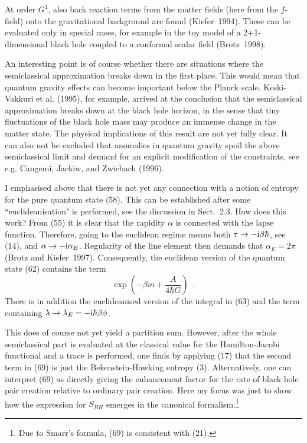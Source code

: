 \documentclass[12pt]{article}
\def\I{{\rm i}}
\newcommand{\be}{\begin{equation}}
\newcommand{\ee}{\end{equation}}
\begin{document}
At order $G^1$, also back reaction terms from the matter fields
(here from the $f$-field) onto the gravitational background
are found (Kiefer~1994). These can be evaluated only in special cases,
for example in the toy model of a 2+1-dimensional black hole
coupled to a conformal scalar field (Brotz~1998).

An interesting point is of course whether there are situations
where the semiclassical approximation breaks down in the first
place. This would mean that quantum gravity effects can become
important below the Planck scale. Keski-Vakkuri et al. (1995), for example,
arrived at the conclusion that the semiclassical approximation
breaks down at the black hole horizon, in the sense that tiny
fluctuations of the black hole mass may produce an immense
change in the matter state. The physical implications of this
result are not yet fully clear. It can also not be excluded that
anomalies in quantum gravity spoil the above semiclassical limit
and demand for an explicit modification of the constraints,
see e.g. Cangemi, Jackiw, and Zwiebach (1996).

I emphasised above that there is not yet any connection with a
notion of entropy for the pure quantum state (58). This can be
established after some ``euclideanisation" is performed,
see the discussion in Sect.~2.3. How does this work?
{}From (55) it is clear that the rapidity $\alpha$ is connected
with the lapse function. Therefore, going to the euclidean regime
means both $\tau\to-\I\beta\hbar$, see (14), and $\alpha\to
-\I\alpha_E$. Regularity of the line element then demands
that $\alpha_E=2\pi$ (Brotz and Kiefer~1997).
Consequently, the euclidean version of the quantum state (62)
contains the term
\be \exp\left(-\beta m+\frac{A}{4\hbar G}\right) \enspace . \ee 
There is in addition the euclideanised version of the integral
in (63) and the term containing $\lambda\to\lambda_E=-\I\hbar\beta\phi$.

This does of course not yet yield a partition sum.
However, after the whole semiclassical part is evaluated
at the classical value for the Hamilton-Jacobi functional
and a trace is performed, one finds by applying (17) that the
second term in (69) is just the Bekenstein-Hawking entropy (3).
Alternatively, one can interpret (69) as directly giving the
enhancement factor for the rate of black hole pair creation
relative to ordinary pair creation. Here my focus was just to show how
the expression for $S_{BH}$ emerges in the canonical
 formalism.\footnote{Due to Smarr's formula, (69) is consistent
with (21).}
\end{document}
